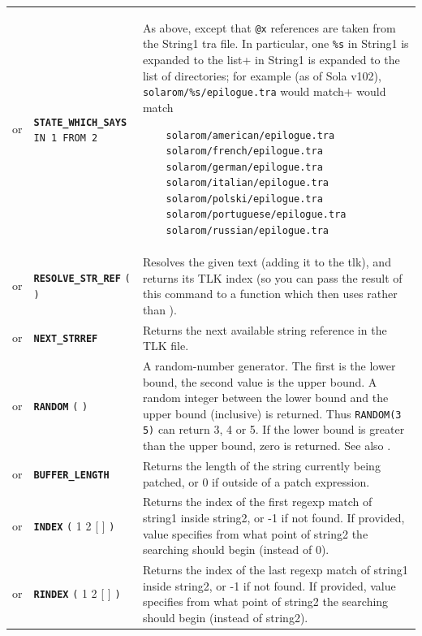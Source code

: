 \documentclass{article}
\def\ttref#1{\ahrefloc{#1}{\tt #1}}
\def\DEFINE#1{{\tt \bf #1}\label{#1}\index{#1}}
\def\DEFSYN#1{{\tt \bf #1}\index{#1}}
\def\t#1{{\tt #1}}
\def\Ob{{\color{red} [ }}
\def\Oe{{\color{red} ] }}
\begin{document}
\begin{tabular}{cp{10in}|p{10in}}
or & \DEFSYN{STATE_WHICH_SAYS} \t{\ttref{value} IN \ttref{String}1 FROM \ttref{String}2} &
  As above, except that \t{@x} references are taken from
    the String1 tra file. In particular, one \verb+%s+ in String1 is expanded to the list
    of directories; for example (as of Sola v102), \verb+solarom/%s/epilogue.tra+ would match
\begin{verbatim}
    solarom/american/epilogue.tra
    solarom/french/epilogue.tra
    solarom/german/epilogue.tra
    solarom/italian/epilogue.tra
    solarom/polski/epilogue.tra
    solarom/portuguese/epilogue.tra
    solarom/russian/epilogue.tra
\end{verbatim}
\\
or & \DEFINE{RESOLVE_STR_REF} \t{(} \ttref{text} \t{)} &
Resolves the given text (adding it to the tlk), and returns its TLK index
(so you can pass the result of this command to a function which then uses
\ttref{WRITE_LONG} rather than \ttref{SAY}).
\\
or & \DEFINE{NEXT_STRREF} &
Returns the next available string reference in the TLK file.
\\
or & \DEFINE{RANDOM} \t{(} \ttref{value} \ttref{value} \t{)} &
A random-number generator. The first \ttref{value} is the lower bound, the
second value is the upper bound. A random integer between the lower bound
and the upper bound (inclusive) is returned. Thus \t{RANDOM(3 5)} can
return 3, 4 or 5. If the lower bound is greater than the upper bound, zero
is returned. See also \ttref{RANDOM_SEED}. \\

or & \DEFINE{BUFFER_LENGTH} &
Returns the length of the string currently being patched, or 0 if outside of
a patch expression. \\

or & \DEFINE{INDEX} \t{(} \ttref{optcase}  \ttref{optexact} \ttref{string}1
\ttref{string}2 \Ob \ttref{value} \Oe \t{)} &
Returns the index of the first regexp match of string1 inside string2, or
-1 if not found. If provided, value specifies from what point of string2
the searching should begin (instead of 0).
\\

or & \DEFINE{RINDEX} \t{(}  \ttref{optcase}  \ttref{optexact} \ttref{string}1
\ttref{string}2 \Ob \ttref{value} \Oe \t{)} &
Returns the index of the last regexp match of string1 inside string2, or
-1 if not found. If provided, value specifies from what point of string2
the searching should begin (instead of \ttref{STRING_LENGTH} string2).
\\


\end{tabular}
\end{document}
